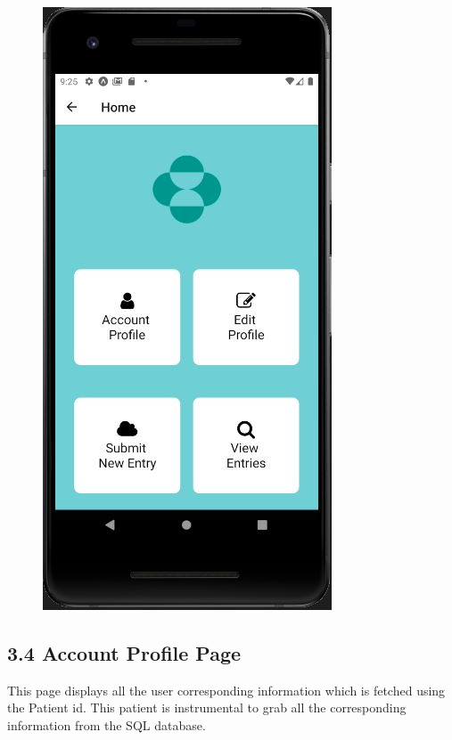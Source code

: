 \documentclass[]{book}
\begin{document}
\begin{figure}
\centering
\includegraphics{./phone_app_doc_images/home_page.JPG}
\caption{}
\end{figure}

\subsection{3.4 Account Profile Page}\label{account-profile-page}

This page displays all the user corresponding information which is
fetched using the Patient id. This patient is instrumental to grab all
the corresponding information from the SQL database.
\end{document}
